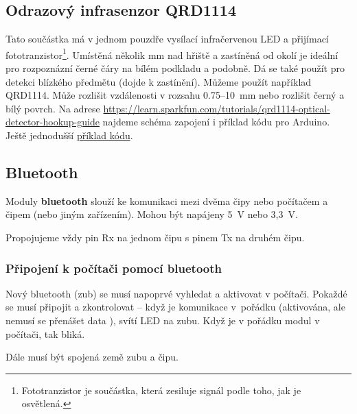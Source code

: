 \subsection{Odrazový infrasenzor QRD1114}

  \label{qrd1114} Tato součástka má v jednom pouzdře vysílací infračervenou LED a přijímací fototranzistor\footnote{Fototranzistor je součástka, která zesiluje signál podle toho, jak je osvětlená.}. Umístěná několik mm nad hřiště a zastíněná od okolí je ideální pro rozpoznázní  černé čáry na bílém podkladu a podobně. Dá se také použít pro detekci blízkého předmětu (dojde k zastínění).
Můžeme použít například QRD1114. Může rozlišit vzdálenosti v rozsahu 0.75--10~mm nebo rozlišit černý a bílý povrch.  
Na adrese
\url{https://learn.sparkfun.com/tutorials/qrd1114-optical-detector-hookup-guide} najdeme schéma zapojení i příklad kódu pro Arduino. Ještě jednodušší \hyperref[prog:qrd1114]{příklad kódu}.

\subsection{Bluetooth} 

\hypertarget{bluetooth}{} Moduly {\bf bluetooth} slouží ke komunikaci mezi dvěma čipy nebo počítačem a čipem (nebo jiným zařízením).
Mohou být napájeny 5~V nebo 3,3~V. 
\label{bluetooth} 

Propojujeme vždy pin Rx na jednom čipu s pinem Tx na druhém čipu. 

\subsubsection*{Připojení k počítači pomocí bluetooth}

Nový bluetooth (zub) se musí napoprvé vyhledat a aktivovat v počítači. 
Pokaždé se musí připojit a zkontrolovat -- když je komunikace v~pořádku (aktivována, ale nemusí se přenášet data ), svítí LED na zubu. 
Když je v pořádku modul v počítači, tak bliká.  

Dále musí být spojená země zubu a čipu.

